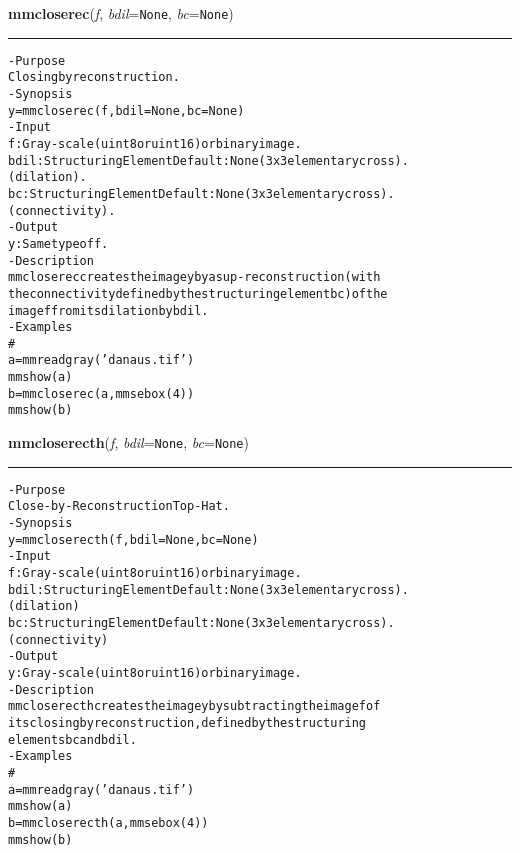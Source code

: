     \label{multireg:num_pymorph:mmcloserec}
    \vspace{0.5ex}

    \begin{boxedminipage}{\textwidth}

    \raggedright \textbf{mmcloserec}(\textit{f}, \textit{bdil}=\texttt{N\-o\-n\-e\-}, \textit{bc}=\texttt{N\-o\-n\-e\-})

    \vspace{-1.5ex}

    \rule{\textwidth}{0.5\fboxrule}
\begin{alltt}
- Purpose
    Closing by reconstruction.
- Synopsis
    y = mmcloserec(f, bdil=None, bc=None)
- Input
    f:    Gray-scale (uint8 or uint16) or binary image.
    bdil: Structuring Element Default: None (3x3 elementary cross).
          (dilation).
    bc:   Structuring Element Default: None (3x3 elementary cross).
          ( connectivity).
- Output
    y: Same type of f .
- Description
    mmcloserec creates the image y by a sup-reconstruction ( with
    the connectivity defined by the structuring element bc ) of the
    image f from its dilation by bdil .
- Examples
    \#
    a = mmreadgray('danaus.tif')
    mmshow(a)
    b = mmcloserec(a,mmsebox(4))
    mmshow(b)\end{alltt}

    \vspace{1ex}

    \end{boxedminipage}

    \label{multireg:num_pymorph:mmcloserecth}
    \vspace{0.5ex}

    \begin{boxedminipage}{\textwidth}

    \raggedright \textbf{mmcloserecth}(\textit{f}, \textit{bdil}=\texttt{N\-o\-n\-e\-}, \textit{bc}=\texttt{N\-o\-n\-e\-})

    \vspace{-1.5ex}

    \rule{\textwidth}{0.5\fboxrule}
\begin{alltt}
- Purpose
    Close-by-Reconstruction Top-Hat.
- Synopsis
    y = mmcloserecth(f, bdil=None, bc=None)
- Input
    f:    Gray-scale (uint8 or uint16) or binary image.
    bdil: Structuring Element Default: None (3x3 elementary cross).
          (dilation)
    bc:   Structuring Element Default: None (3x3 elementary cross).
          ( connectivity)
- Output
    y: Gray-scale (uint8 or uint16) or binary image.
- Description
    mmcloserecth creates the image y by subtracting the image f of
    its closing by reconstruction, defined by the structuring
    elements bc and bdil .
- Examples
    \#
    a = mmreadgray('danaus.tif')
    mmshow(a)
    b = mmcloserecth(a,mmsebox(4))
    mmshow(b)\end{alltt}

    \vspace{1ex}

    \end{boxedminipage}

